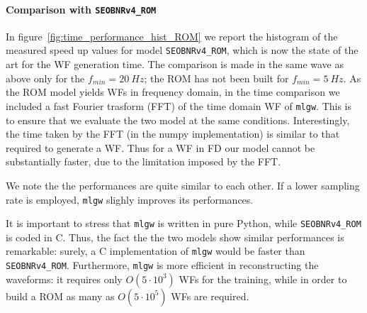 \paragraph{Comparison with \texttt{SEOBNRv4\_ROM}}
In figure~\ref{fig:time_performance_hist_ROM} we report the histogram of the measured speed up values for model \texttt{SEOBNRv4\_ROM}, which is now the state of the art for the WF generation time.
The comparison is made in the same wave as above only for the $f_{min} = \SI{20}{Hz}$; the ROM has not been built for $f_{min} = \SI{5}{Hz}$.
As the ROM model yields WFs in frequency domain, in the time comparison we included a fast Fourier trasform (FFT) of the time domain WF of \texttt{mlgw}. This is to ensure that we evaluate the two model at the same conditions.
Interestingly, the time taken by the FFT (in the numpy implementation) is similar to that required to generate a WF. Thus for a WF in FD our model cannot be substantially faster, due to the limitation imposed by the FFT.
\par
We note the the performances are quite similar to each other.
If a lower sampling rate is employed, \texttt{mlgw} slighly improves its performances.
\par
It is important to stress that \texttt{mlgw} is written in pure Python, while \texttt{SEOBNRv4\_ROM} is coded in C. Thus, the fact the the two models show similar performances is remarkable: surely, a C implementation of \texttt{mlgw} would be faster than \texttt{SEOBNRv4\_ROM}.
Furthermore, \texttt{mlgw} is more efficient in reconstructing the waveforms: it requires only $O(5\cdot 10^3)$ WFs for the training, while in order to build a ROM as many as $O(5\cdot 10^5)$ WFs are required.
\par
